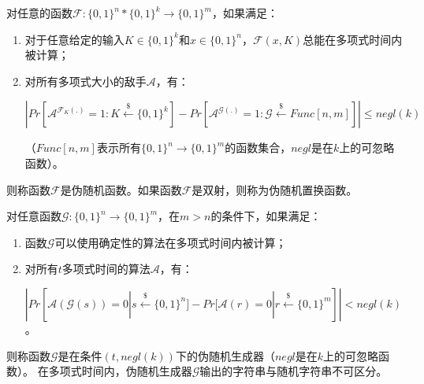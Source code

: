 \begin{defn}
\label{defn:psedu_random_function}

对任意的函数$\mathcal{F} : \{0,1\}^n * \{0,1\}^k \rightarrow \{0,1\}^m$，如果满足：
\begin{enumerate}
  \item
  对于任意给定的输入$K \in \{0,1\}^k$和$x \in \{0,1\}^n$，$\mathcal{F}(x,K)$总能在多项式时间内被计算；

  \item
  对所有多项式大小的敌手$\mathcal{A}$，有：
  \begin{center}
  $|Pr[\mathcal{A}^{\mathcal{F}_K(.)} = 1 : K \overset{\$}{\leftarrow} \{0,1\}^k] - Pr[\mathcal{A}^{\mathcal{G}(.)} = 1 : \mathcal{G} \overset{\$}{\leftarrow} Func[n,m]]| \leq negl(k) $
  \end{center}
（$Func[n,m]$表示所有$\{0,1\}^n \rightarrow \{0,1\}^m$的函数集合，$negl$是在$k$上的可忽略函数）。

\end{enumerate}
则称函数$\mathcal{F}$是伪随机函数。如果函数$\mathcal{F}$是双射，则称为伪随机置换函数。

\end{defn}



\begin{defn}
\label{defn:pseudo_random_generator}
对任意函数$\mathcal{G}: \{0,1\}^n \rightarrow \{0,1\}^m$，在$m > n$的条件下，如果满足：
\begin{enumerate}
    \item
    函数$\mathcal{G}$可以使用确定性的算法在多项式时间内被计算；

    \item
    对所有$t$多项式时间的算法$\mathcal{A}$，有：
    \begin{center}
    $|Pr[\mathcal{A}(\mathcal{G}(s)) = 0 | s \overset{\$}\leftarrow \{0,1\}^n] - Pr[\mathcal{A}(r) = 0 | r \overset{\$} \leftarrow \{0,1\}^m]| < negl(k)$。
    \end{center}

\end{enumerate}
则称函数$\mathcal{G}$是在条件$(t,negl(k))$下的伪随机生成器（$negl$是在$k$上的可忽略函数）。
在多项式时间内，伪随机生成器$\mathcal{G}$输出的字符串与随机字符串不可区分。
\end{defn}


